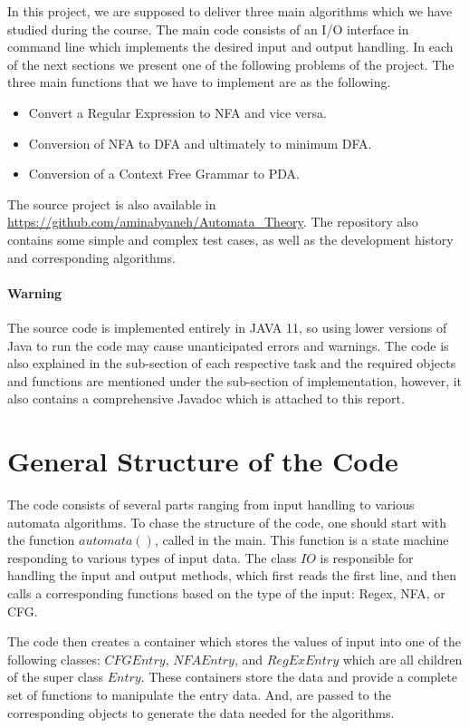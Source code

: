 \documentclass[
12pt, %
a4paper, %
oneside, %
headinclude,footinclude, %
BCOR5mm, %
]{scrartcl}
\begin{document}
In this project, we are supposed to deliver three main algorithms which we have studied during the course. The main code consists of an I/O interface in command line which implements the desired input and output handling. In each of the next sections we present one of the following problems of the project. The three main functions that we have to implement are as the following.

\begin{itemize}
	\item Convert a Regular Expression to NFA and vice versa.
	\item Conversion of NFA to DFA and ultimately to minimum DFA.
	\item Conversion of a Context Free Grammar to PDA.
\end{itemize}

The source project is also available in \url{https://github.com/aminabyaneh/Automata_Theory}. The repository also contains some simple and complex test cases, as well as the development history and corresponding algorithms.

\paragraph{Warning} The source code is implemented entirely in JAVA 11, so using lower versions of Java to run the code may cause unanticipated errors and warnings. The code is also explained in the sub-section of each respective task and the required objects and functions are mentioned under the sub-section of implementation, however, it also contains a comprehensive Javadoc which is attached to this report.

\newpage
\section{General Structure of the Code}
The code consists of several parts ranging from input handling to various automata algorithms. To chase the structure of the code, one should start with the function $automata()$, called in the main. This function is a state machine responding to various types of input data. The class $IO$ is responsible for handling the input and output methods, which first reads the first line, and then calls a corresponding functions based on the type of the input: Regex, NFA, or CFG. 

The code then creates a container which stores the values of input into one of the following classes: $CFGEntry$, $NFAEntry$, and $RegExEntry$ which are all children of the super class $Entry$. These containers store the data and provide a complete set of functions to manipulate the entry data. And, are passed to the corresponding objects to generate the data needed for the algorithms.
\end{document}
